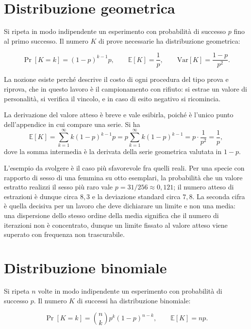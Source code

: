\section{Distribuzione geometrica}

Si ripeta in modo indipendente un esperimento con probabilità di successo $p$ fino al primo successo. Il numero $K$ di prove necessarie ha distribuzione geometrica:

\begin{equation}
\Pr[K = k] = (1-p)^{k-1} p, \qquad \mathbb{E}[K] = \frac{1}{p}, \qquad \mathrm{Var}[K] = \frac{1-p}{p^2}.
\end{equation}

La nozione esiste perché descrive il costo di ogni procedura del tipo prova e riprova, che in questo lavoro è il campionamento con rifiuto: si estrae un valore di personalità, si verifica il vincolo, e in caso di esito negativo si ricomincia.

La derivazione del valore atteso è breve e vale esibirla, poiché è l'unico punto dell'appendice in cui compare una serie. Si ha
\begin{equation}
\mathbb{E}[K] = \sum_{k=1}^{\infty} k (1-p)^{k-1} p = p \sum_{k=1}^{\infty} k (1-p)^{k-1} = p \cdot \frac{1}{p^2} = \frac{1}{p},
\end{equation}
dove la somma intermedia è la derivata della serie geometrica valutata in $1-p$.

L'esempio da svolgere è il caso più sfavorevole fra quelli reali. Per una specie con rapporto di sesso di una femmina su otto esemplari, la probabilità che un valore estratto realizzi il sesso più raro vale $p = 31/256 \approx 0{,}121$; il numero atteso di estrazioni è dunque circa $8{,}3$ e la deviazione standard circa $7{,}8$. La seconda cifra è quella decisiva per un lavoro che deve dichiarare un limite e non una media: una dispersione dello stesso ordine della media significa che il numero di iterazioni non è concentrato, dunque un limite fissato al valore atteso viene superato con frequenza non trascurabile.

\section{Distribuzione binomiale}

Si ripeta $n$ volte in modo indipendente un esperimento con probabilità di successo $p$. Il numero $K$ di successi ha distribuzione binomiale:

\begin{equation}
\Pr[K = k] = \binom{n}{k} p^k (1-p)^{n-k}, \qquad \mathbb{E}[K] = n p .
\end{equation}

